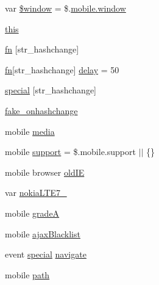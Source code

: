 \begin{DoxyCompactItemize}
\item 
var \hyperlink{jquery_8mobile-1_83_81_8js_acaa13bb8408e342bf72cee7f89ed1296}{\$window} = \$.\hyperlink{jquery_8mobile-1_83_81_8js_ad55530ae1e5978df8e721017c1fc8466}{mobile.\+window}
\item 
\hyperlink{jquery_8mobile-1_83_81_8js_a05c09a5e9d53fa7adf0a7936038c2fa3}{this}
\item 
\hyperlink{jquery_8mobile-1_83_81_8js_a070a098c013c19f1fbe3cec06e21420f}{fn} \mbox{[}str\+\_\+hashchange\mbox{]}
\item 
\hyperlink{jquery_8mobile-1_83_81_8js_a070a098c013c19f1fbe3cec06e21420f}{fn}\mbox{[}str\+\_\+hashchange\mbox{]} \hyperlink{jquery_8mobile-1_83_81_8js_aa109bb8c15dd398a7b3059507518c06e}{delay} = 50
\item 
\hyperlink{jquery_8mobile-1_83_81_8js_a8891fd2268d56dd915745aab71faaf7f}{special} \mbox{[}str\+\_\+hashchange\mbox{]}
\item 
\hyperlink{jquery_8mobile-1_83_81_8js_ae8a6978b62641d58e1218a69571ae6be}{fake\+\_\+onhashchange}
\item 
mobile \hyperlink{jquery_8mobile-1_83_81_8js_a3148ef8fdd8188fbb0d357ea534e6741}{media}
\item 
mobile \hyperlink{jquery_8mobile-1_83_81_8js_a9609bc27ca5c7f02203b330bb5dd0133}{support} = \$.mobile.\+support $\vert$$\vert$ \{\}
\item 
mobile browser \hyperlink{jquery_8mobile-1_83_81_8js_abd4431e641ae0612556b08173d3fb7ae}{old\+I\+E}
\item 
var \hyperlink{jquery_8mobile-1_83_81_8js_a988cb4d05bdab37547b121097fdad1d8}{nokia\+L\+T\+E7\+\_}
\item 
mobile \hyperlink{jquery_8mobile-1_83_81_8js_a3831d815d58027c664811e749e51021d}{grade\+A}
\item 
mobile \hyperlink{jquery_8mobile-1_83_81_8js_ab664d5e8132df9fa59488eadba5f4cae}{ajax\+Blacklist}
\item 
event \hyperlink{jquery_8mobile-1_83_81_8js_a8891fd2268d56dd915745aab71faaf7f}{special} \hyperlink{jquery_8mobile-1_83_81_8js_ae9f88fea06dbeadb1fe0c2869fdc02b9}{navigate}
\item 
mobile \hyperlink{jquery_8mobile-1_83_81_8js_a85880b4fcfb12e8240a306187313f0b4}{path}
\end{DoxyCompactItemize}


